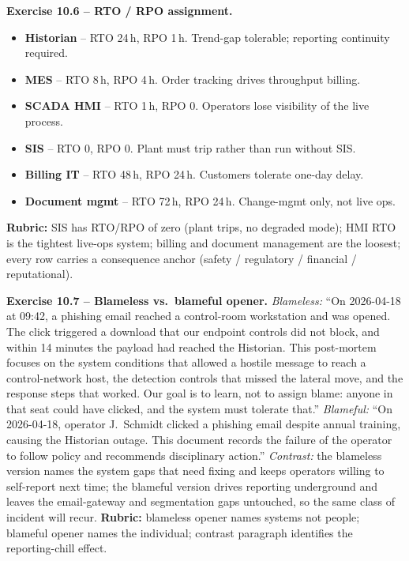 \documentclass[11pt,a4paper]{article}
\begin{document}
\begin{solutionbox}
\textbf{Exercise 10.6 -- RTO / RPO assignment.}
\begin{itemize}\setlength{\itemsep}{1pt}\small
  \item \textbf{Historian} -- RTO 24\,h, RPO 1\,h. Trend-gap tolerable; reporting continuity required.
  \item \textbf{MES} -- RTO 8\,h, RPO 4\,h. Order tracking drives throughput billing.
  \item \textbf{SCADA HMI} -- RTO 1\,h, RPO 0. Operators lose visibility of the live process.
  \item \textbf{SIS} -- RTO 0, RPO 0. Plant must trip rather than run without SIS.
  \item \textbf{Billing IT} -- RTO 48\,h, RPO 24\,h. Customers tolerate one-day delay.
  \item \textbf{Document mgmt} -- RTO 72\,h, RPO 24\,h. Change-mgmt only, not live ops.
\end{itemize}
\textbf{Rubric:} SIS has RTO/RPO of zero (plant trips, no degraded mode); HMI
RTO is the tightest live-ops system; billing and document management are the
loosest; every row carries a consequence anchor (safety / regulatory /
financial / reputational).
\end{solutionbox}

\begin{solutionbox}
\textbf{Exercise 10.7 -- Blameless vs.\ blameful opener.}
\textit{Blameless:} ``On 2026-04-18 at 09:42, a phishing email reached a
control-room workstation and was opened. The click triggered a download that
our endpoint controls did not block, and within 14 minutes the payload had
reached the Historian. This post-mortem focuses on the system conditions that
allowed a hostile message to reach a control-network host, the detection
controls that missed the lateral move, and the response steps that worked.
Our goal is to learn, not to assign blame: anyone in that seat could have
clicked, and the system must tolerate that.'' \textit{Blameful:} ``On
2026-04-18, operator J.\ Schmidt clicked a phishing email despite annual
training, causing the Historian outage. This document records the failure of
the operator to follow policy and recommends disciplinary action.''
\textit{Contrast:} the blameless version names the system gaps that need
fixing and keeps operators willing to self-report next time; the blameful
version drives reporting underground and leaves the email-gateway and
segmentation gaps untouched, so the same class of incident will recur.
\textbf{Rubric:} blameless opener names systems not people; blameful opener
names the individual; contrast paragraph identifies the reporting-chill
effect.
\end{solutionbox}
\end{document}
